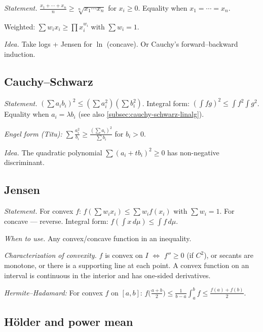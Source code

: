 \textit{Statement.} $\frac{x_1+\cdots+x_n}{n}\geq\sqrt[n]{x_1\cdots x_n}$ for $x_i\geq0$. Equality when $x_1=\cdots=x_n$.

Weighted: $\sum w_i x_i\geq\prod x_i^{w_i}$ with $\sum w_i=1$.

\textit{Idea.} Take logs + Jensen for $\ln$ (concave). Or Cauchy's forward--backward induction.

\medskip

\subsection{Cauchy--Schwarz}
\label{subsec:cs-calculus}

\textit{Statement.} $(\sum a_i b_i)^2\leq(\sum a_i^2)(\sum b_i^2)$. Integral form: $(\int fg)^2\leq\int f^2\int g^2$. Equality when $a_i=\lambda b_i$ (see also \ref{subsec:cauchy-schwarz-linalg}).

\textit{Engel form (Titu):} $\sum\frac{a_i^2}{b_i}\geq\frac{(\sum a_i)^2}{\sum b_i}$ for $b_i>0$.

\textit{Idea.} The quadratic polynomial $\sum(a_i+tb_i)^2\geq0$ has non-negative discriminant.

\medskip

\subsection{Jensen}
\label{subsec:jensen}

\textit{Statement.} For convex $f$: $f(\sum w_i x_i)\leq\sum w_i f(x_i)$ with $\sum w_i=1$. For concave --- reverse. Integral form: $f(\int x\,d\mu)\leq\int f\,d\mu$.

\textit{When to use.} Any convex/concave function in an inequality.

\textit{Characterization of convexity.} $f$ is convex on $I$ $\iff$ $f''\geq0$ (if $C^2$), or secants are monotone, or there is a supporting line at each point. A convex function on an interval is continuous in the interior and has one-sided derivatives.

\textit{Hermite--Hadamard:} For convex $f$ on $[a,b]$: $f\bigl(\frac{a+b}{2}\bigr)\leq\frac1{b-a}\int_a^b f\leq\frac{f(a)+f(b)}{2}$.

\medskip

\subsection{H\"older and power mean}
\label{subsec:holder-power-mean}

